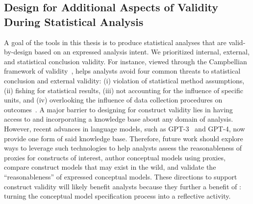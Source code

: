 \subsection{Design for Additional Aspects of Validity During Statistical Analysis}
A goal of the tools in this thesis is to produce statistical analyses that are
valid-by-design based on an expressed analysis intent. We prioritized internal,
external, and statistical conclusion validity. For instance, viewed through the
Campbellian framework of
validity~\cite{campbell2015quasiexperimentalDesigns,cook2002generalizedCausalInference},
\tisane helps analysts avoid four common threats to statistical conclusion and
external validity: (i) violation of statistical method assumptions, (ii) fishing
for statistical results, (iii) not accounting for the influence of specific
units, and (iv) overlooking the influence of data collection procedures on
outcomes~\cite{cook2002generalizedCausalInference}. A major barrier to designing
for construct validity lies in having access to and incorporating a knowledge
base about any domain of analysis. However, recent advances in language models,
such as GPT-3~\cite{brown2020language} and GPT-4, now provide one form of said knowledge base.
Therefore, future work should explore ways to leverage such technologies to help
analysts assess the reasonableness of proxies for constructs of interest, author
conceptual models using proxies, compare construct models that may exist in the
wild, and validate the ``reasonableness'' of expressed conceptual models. These
directions to support construct validity will likely benefit analysts because
they further a benefit of \rTisane: turning the conceptual model specification
process into a reflective activity. 



